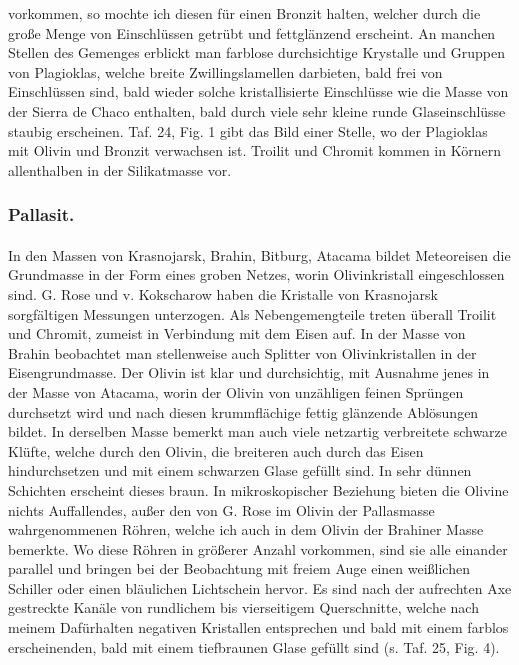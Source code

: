 \documentclass[a4paper, 11pt, oneside, polutonikogreek, german]{article}
\begin{document}
vorkommen, so mochte ich diesen für einen Bronzit halten, welcher durch die große Menge von Einschlüssen getrübt und fettglänzend erscheint. An manchen Stellen des Gemenges erblickt man farblose durchsichtige Krystalle und Gruppen von Plagioklas, welche breite Zwillingslamellen darbieten, bald frei von Einschlüssen sind, bald wieder solche kristallisierte Einschlüsse wie die Masse von der Sierra de Chaco enthalten, bald durch viele sehr kleine runde Glaseinschlüsse staubig erscheinen. Taf. 24, Fig. 1 gibt das Bild einer Stelle, wo der Plagioklas mit Olivin und Bronzit verwachsen ist. Troilit und Chromit kommen in Körnern allenthalben in der Silikatmasse vor.

\subsubsection{Pallasit.}
\paragraph{}
In den Massen von Krasnojarsk, Brahin, Bitburg, Atacama bildet Meteoreisen die Grundmasse in der Form eines groben Netzes, worin Olivinkristall eingeschlossen sind. G. Rose und v. Kokscharow haben die Kristalle von Krasnojarsk sorgfältigen Messungen unterzogen. Als Nebengemengteile treten überall Troilit und Chromit, zumeist in Verbindung mit dem Eisen auf. In der Masse von Brahin beobachtet man stellenweise auch Splitter von Olivinkristallen in der Eisengrundmasse. Der Olivin ist klar und durchsichtig, mit Ausnahme jenes in der Masse von Atacama, worin der Olivin von unzähligen feinen Sprüngen durchsetzt wird und nach diesen krummflächige fettig glänzende Ablösungen bildet. In derselben Masse bemerkt man auch viele netzartig verbreitete schwarze Klüfte, welche durch den Olivin, die breiteren auch durch das Eisen hindurchsetzen und mit einem schwarzen Glase gefüllt sind. In sehr dünnen Schichten erscheint dieses braun. In mikroskopischer Beziehung bieten die Olivine nichts Auffallendes, außer den von G. Rose im Olivin der Pallasmasse wahrgenommenen Röhren, welche ich auch in dem Olivin der Brahiner Masse bemerkte. Wo diese Röhren in größerer Anzahl vorkommen, sind sie alle einander parallel und bringen bei der Beobachtung mit freiem Auge einen weißlichen Schiller oder einen bläulichen Lichtschein hervor. Es sind nach der aufrechten Axe gestreckte Kanäle von rundlichem bis vierseitigem Querschnitte, welche nach meinem Dafürhalten negativen Kristallen entsprechen und bald mit einem farblos erscheinenden, bald mit einem tiefbraunen Glase gefüllt sind (s. Taf. 25, Fig. 4).
\clearpage
\end{document}
